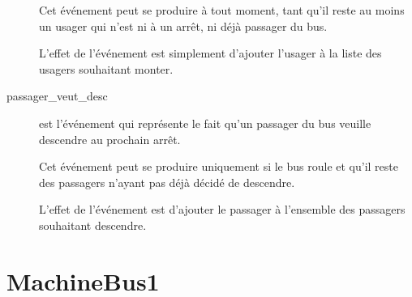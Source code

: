 \documentclass[a4paper,titlepage]{report}
\begin{document}
\begin{description}
			Cet événement peut se produire à tout moment, tant qu'il reste au moins un usager qui n'est ni à un arrêt, ni déjà passager du bus.
			
			L'effet de l'événement est simplement d'ajouter l'usager à la liste des usagers souhaitant monter.\\
			
			\item[passager\_veut\_desc] est l'événement qui représente le fait qu'un passager du bus veuille descendre au prochain arrêt.
			
			Cet événement peut se produire uniquement si le bus roule et qu'il reste des passagers n'ayant pas déjà décidé de descendre.
			
			L'effet de l'événement est d'ajouter le passager à l'ensemble des passagers souhaitant descendre.\\
		\end{description}
		
	\section{MachineBus1}
		
\end{document}
